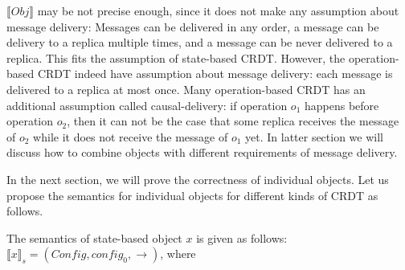 $\llbracket \mathit{Obj} \rrbracket$ may be not precise enough, since it does not make any assumption about message delivery: Messages can be delivered in any order, a message can be delivery to a replica multiple times, and a message can be never delivered to a replica. This fits the assumption of state-based CRDT. However, the operation-based CRDT indeed have assumption about message delivery: each message is delivered to a replica at most once. Many operation-based CRDT has an additional assumption called causal-delivery: if operation $o_1$ happens before operation $o_2$, then it can not be the case that some replica receives the message of $o_2$ while it does not receive the message of $o_1$ yet. In latter section we will discuss how to combine objects with different requirements of message delivery.

In the next section, we will prove the correctness of individual objects. Let us propose the semantics for individual objects for different kinds of CRDT as follows.

The semantics of state-based object $x$ is given as follows: $\llbracket x \rrbracket_{s} = (\mathit{Config},\mathit{config}_0,\rightarrow)$, where

